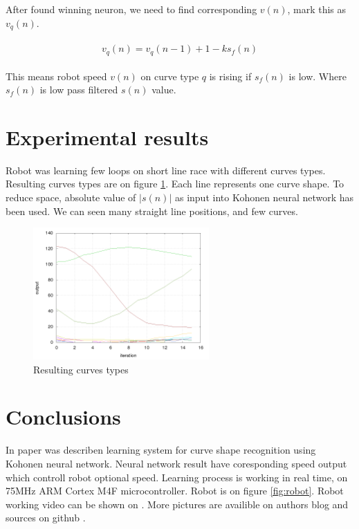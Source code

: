 \documentclass[twoside]{oss-conf-eng}
\begin{document}
After found winning neuron, we need to find corresponding $v(n)$, mark this as
$v_q(n)$.


\begin{eqnarray}
\begin{split}
\label{speed_estimating}
v_q(n) = v_q(n-1) + 1 - k s_f(n)
\end{split}
\end{eqnarray}

This means robot speed $v(n)$ on curve type $q$ is rising if $s_f(n)$ is low.
Where $s_f(n)$ is low pass filtered $s(n)$ value.

\section{Experimental results}

Robot was learning few loops on short line race with different curves types.
Resulting curves types are on figure \ref{fig:curves}. Each line represents
one curve shape. To reduce space, absolute value of $|s(n)|$ as input into
Kohonen neural network has been used. We can seen many straight line positions, and
few curves.

\begin{figure}[]
    \centering
    \includegraphics[width=0.6\textwidth]{prediction/predictor.png}
    \caption{Resulting curves types}
    \label{fig:curves}
\end{figure}

\section{Conclusions}

In paper was describen learning system for curve shape recognition using Kohonen
neural network. Neural network result have coresponding speed output which controll
robot optional speed. Learning process is working in real time,
on 75MHz ARM Cortex M4F microcontroller. Robot is on figure \ref{fig:robot}.
Robot working video can be shown on \cite{robot_video}. More pictures are
availible on authors blog and sources on github \cite{blog_git}.
\end{document}
